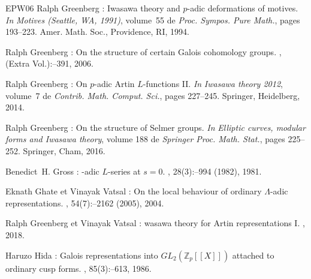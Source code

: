 \documentclass[12pt]{amsart}
\theoremstyle{defstyle}
\theoremstyle{thmstyle}
\begin{document}
\begin{thebibliography}{EPW06}
Ralph \bgroup\fonteauteurs\bgroup Greenberg\egroup\egroup{} :
\newblock Iwasawa theory and {$p$}-adic deformations of motives.
\newblock \emph{In} {\em Motives ({S}eattle, {WA}, 1991)}, volume~55 de {\em
  Proc. Sympos. Pure Math.}, pages 193--223. Amer. Math. Soc., Providence, RI,
  1994.

Ralph \bgroup\fonteauteurs\bgroup Greenberg\egroup\egroup{} :
\newblock On the structure of certain {G}alois cohomology groups.
, (Extra Vol.)\string:--391,
  2006.

Ralph \bgroup\fonteauteurs\bgroup Greenberg\egroup\egroup{} :
\newblock On {$p$}-adic {A}rtin {$L$}-functions {II}.
\newblock \emph{In} {\em Iwasawa theory 2012}, volume~7 de {\em Contrib. Math.
  Comput. Sci.}, pages 227--245. Springer, Heidelberg, 2014.

Ralph \bgroup\fonteauteurs\bgroup Greenberg\egroup\egroup{} :
\newblock On the structure of {S}elmer groups.
\newblock \emph{In} {\em Elliptic curves, modular forms and {I}wasawa theory},
  volume 188 de {\em Springer Proc. Math. Stat.}, pages 225--252. Springer,
  Cham, 2016.

Benedict~H. \bgroup\fonteauteurs\bgroup Gross\egroup\egroup{} :
-adic {$L$}-series at {$s=0$}.
,
  28(3)\string:--994 (1982), 1981.

Eknath \bgroup\fonteauteurs\bgroup Ghate\egroup\egroup{} et Vinayak
  \bgroup\fonteauteurs\bgroup Vatsal\egroup\egroup{} :
\newblock On the local behaviour of ordinary {$\Lambda$}-adic representations.
, 54(7)\string:--2162 (2005), 2004.

Ralph \bgroup\fonteauteurs\bgroup Greenberg\egroup\egroup{} et Vinayak
  \bgroup\fonteauteurs\bgroup Vatsal\egroup\egroup{} :
wasawa theory for {A}rtin representations {I}.
, 2018.

Haruzo \bgroup\fonteauteurs\bgroup Hida\egroup\egroup{} :
\newblock Galois representations into {$GL_2 (\mathbb{Z}_p [[X]])$} attached to
  ordinary cusp forms.
, 85(3)\string:--613, 1986.


\end{thebibliography}
\end{document}
